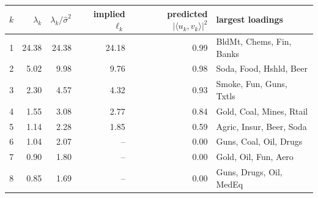\begin{tabular}{rrrrrl}
\toprule
$k$ & $\lambda_k$ & $\lambda_k/\hat\sigma^2$ & implied $\ell_k$ & predicted $|\langle u_k,v_k\rangle|^2$ & largest loadings\\
\midrule
1 & 24.38 & 24.38 & 24.18 & 0.99 & BldMt, Chems, Fin, Banks \\
2 & 5.02 & 9.98 & 9.76 & 0.98 & Soda, Food, Hshld, Beer \\
3 & 2.30 & 4.57 & 4.32 & 0.93 & Smoke, Fun, Guns, Txtls \\
4 & 1.55 & 3.08 & 2.77 & 0.84 & Gold, Coal, Mines, Rtail \\
5 & 1.14 & 2.28 & 1.85 & 0.59 & Agric, Insur, Beer, Soda \\
6 & 1.04 & 2.07 & -- & 0.00 & Guns, Coal, Oil, Drugs \\
7 & 0.90 & 1.80 & -- & 0.00 & Gold, Oil, Fun, Aero \\
8 & 0.85 & 1.69 & -- & 0.00 & Guns, Drugs, Oil, MedEq \\
\bottomrule
\end{tabular}

